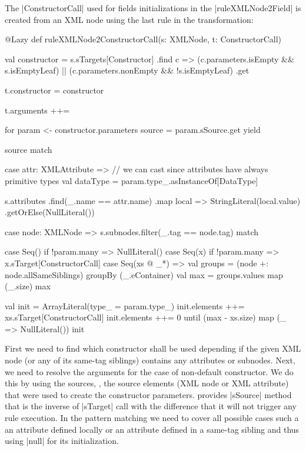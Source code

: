 The \Scala|ConstructorCall| used for fields initializations in the \Scala|ruleXMLNode2Field| is created from an XML node using the last rule in the transformation:
%
\begin{scalacode}
@Lazy
def ruleXMLNode2ConstructorCall(s: XMLNode, t: ConstructorCall) {
  val constructor = s.sTargets[Constructor]
    .find { c =>
      (c.parameters.isEmpty && s.isEmptyLeaf) ||
      (c.parameters.nonEmpty && !s.isEmptyLeaf)
    }
    .get

  t.constructor = constructor

  t.arguments ++= {
    for {
      param <- constructor.parameters
      source = param.sSource.get
    } yield {
      source match {
        case attr: XMLAttribute =>
          // we can cast since attributes have always primitive types
          val dataType = param.type_.asInstanceOf[DataType]

          s.attributes
            .find(_.name == attr.name)
            .map { local => StringLiteral(local.value) }
            .getOrElse(NullLiteral())

        case node: XMLNode =>
          s.subnodes.filter(_.tag == node.tag) match {

            case Seq() if !param.many =>
              NullLiteral()
            case Seq(x) if !param.many =>
              x.sTarget[ConstructorCall]
            case Seq(xs @ _*) =>
              val groups = (node +: node.allSameSiblings) groupBy (_.eContainer)
              val max = groups.values map (_.size) max
              
              val init = ArrayLiteral(type_ = param.type_)
              init.elements ++= xs.sTarget[ConstructorCall]
              init.elements ++= 0 until (max - xs.size) map (_ => NullLiteral())
              init
          }
      }
    }
  }
}
\end{scalacode}  

First we need to find which constructor shall be used depending if the given XML node (or any of its same-tag siblings) contains any attributes or subnodes.
Next, we need to resolve the arguments for the case of non-default constructor.
We do this by using the sources, \Ie, the source elements (XML node or XML attribute) that were used to create the constructor parameters.
\SIGMA provides \Scala|sSource| method that is the inverse of \Scala|sTarget| call with the difference that it will not trigger any rule execution.
In the pattern matching we need to cover all possible cases such a an attribute defined locally or an attribute defined in a same-tag sibling and thus using \Scala|null| for its initialization.

